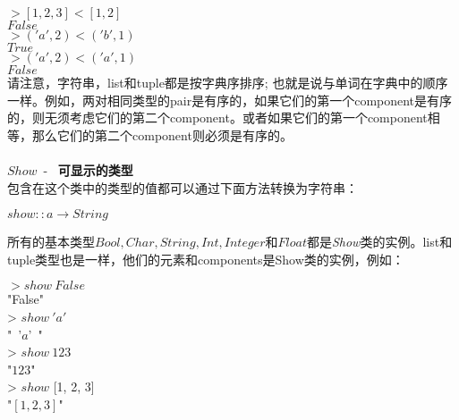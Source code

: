 \noindent\hspace*{1cm} $> [1, 2, 3] < [1, 2]$\\
\hspace*{1cm} $False$\\

\noindent\hspace*{1cm} $> ('a', 2) < ('b', 1)$\\
\hspace*{1cm} $True$\\

\noindent\hspace*{1cm} $> ('a', 2) < ('a', 1)$\\
\hspace*{1cm} $False$\\

请注意，字符串，list和tuple都是按字典序排序;
也就是说与单词在字典中的顺序一样。例如，两对相同类型的pair是有序的，如果它们的第一个component是有序的，则无须考虑它们的第二个component。或者如果它们的第一个component相等，那么它们的第二个component则必须是有序的。
\\
\\
\noindent$Show$~-~ \textbf{可显示的类型}\\
包含在这个类中的类型的值都可以通过下面方法转换为字符串：

\noindent\hspace*{1cm} $show :: a \rightarrow String$

所有的基本类型$Bool, Char, String, Int,
Integer$和$Float$都是\textit{Show}类的实例。list和tuple类型也是一样，他们的元素和components是Show类的实例，例如：

\noindent\hspace*{1cm} $> show~False$\\
\hspace*{1cm} "False"\\

\noindent\hspace*{1cm} > $show~'a'$\\
\hspace*{1cm} "~'$a$'~"\\

\noindent\hspace*{1cm} > $show~123$\\
\hspace*{1cm} "$123$"\\

\noindent\hspace*{1cm} > $show$ [1, 2, 3]\\
\hspace*{1cm} "$[1, 2, 3]$"\\

